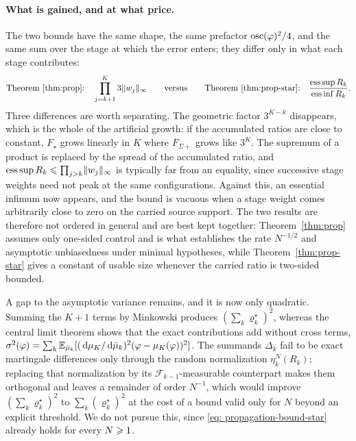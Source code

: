 \documentclass{article}
\begin{document}
{\paragraph{What is gained, and at what price.} The two bounds have the same shape, the same prefactor $\operatorname{osc}(\varphi)^2/4$, and the same sum over the stage at which the error enters; they differ only in what each stage contributes:
\begin{equation*}
    \text{Theorem~\ref{thm:prop}:}\quad\prod_{j=k+1}^{K}3\lVert w_j\rVert_\infty
    \qquad\text{versus}\qquad
    \text{Theorem~\ref{thm:prop-star}:}\quad\frac{\operatorname*{ess\,sup}R_k}{\operatorname*{ess\,inf}R_k}.
\end{equation*}
Three differences are worth separating. The geometric factor $3^{K-k}$ disappears, which is the whole of the artificial growth: if the accumulated ratios are close to constant, $F_\star$ grows linearly in $K$ where $F_{\Sigma+}$ grows like $3^{K}$. The supremum of a product is replaced by the spread of the accumulated ratio, and $\operatorname{ess\,sup}R_k\leqslant\prod_{j>k}\lVert w_j\rVert_\infty$ is typically far from an equality, since successive stage weights need not peak at the same configurations. Against this, an essential infimum now appears, and the bound is vacuous when a stage weight comes arbitrarily close to zero on the carried source support. The two results are therefore not ordered in general and are best kept together: Theorem~\ref{thm:prop} assumes only one-sided control and is what establishes the rate $N^{-1/2}$ and asymptotic unbiasedness under minimal hypotheses, while Theorem~\ref{thm:prop-star} gives a constant of usable size whenever the carried ratio is two-sided bounded.

A gap to the asymptotic variance remains, and it is now only quadratic. Summing the $K+1$ terms by Minkowski produces $(\sum_k\varrho^\star_k)^2$, whereas the central limit theorem shows that the exact contributions add without cross terms, $\sigma^2(\varphi)=\sum_k\mathbb E_{\bar\mu_k}[(\,\mathrm d\mu_K/\,\mathrm d\bar\mu_k)^2(\varphi-\mu_K(\varphi))^2]$. The summands $\Delta_k$ fail to be exact martingale differences only through the random normalization $\eta_k^N(R_k)$; replacing that normalization by its $\mathcal F_{k-1}$-measurable counterpart makes them orthogonal and leaves a remainder of order $N^{-1}$, which would improve $(\sum_k\varrho^\star_k)^2$ to $\sum_k(\varrho^\star_k)^2$ at the cost of a bound valid only for $N$ beyond an explicit threshold. We do not pursue this, since \eqref{eq: propagation-bound-star} already holds for every $N\geqslant1$.

}
\end{document}
